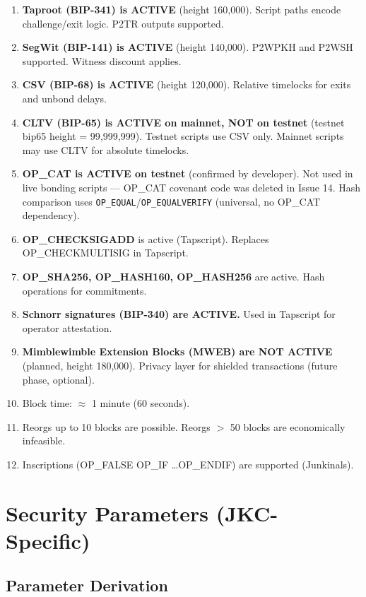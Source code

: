 \documentclass[a4paper,11pt]{article}
\begin{document}
\begin{enumerate}[nosep]
    \item \textbf{Taproot (BIP-341) is ACTIVE} (height 160{,}000). Script paths encode challenge/exit logic. P2TR outputs supported.
    \item \textbf{SegWit (BIP-141) is ACTIVE} (height 140{,}000). P2WPKH and P2WSH supported. Witness discount applies.
    \item \textbf{CSV (BIP-68) is ACTIVE} (height 120{,}000). Relative timelocks for exits and unbond delays.
    \item \textbf{CLTV (BIP-65) is ACTIVE on mainnet, NOT on testnet} (testnet bip65 height = 99{,}999{,}999). Testnet scripts use CSV only. Mainnet scripts may use CLTV for absolute timelocks.
    \item \textbf{OP\_CAT is ACTIVE on testnet} (confirmed by developer). Not used in live bonding scripts — OP\_CAT covenant code was deleted in Issue 14. Hash comparison uses \texttt{OP\_EQUAL}/\texttt{OP\_EQUALVERIFY} (universal, no OP\_CAT dependency).
    \item \textbf{OP\_CHECKSIGADD} is active (Tapscript). Replaces OP\_CHECKMULTISIG in Tapscript.
    \item \textbf{OP\_SHA256, OP\_HASH160, OP\_HASH256} are active. Hash operations for commitments.
    \item \textbf{Schnorr signatures (BIP-340) are ACTIVE.} Used in Tapscript for operator attestation.
    \item \textbf{Mimblewimble Extension Blocks (MWEB) are NOT ACTIVE} (planned, height 180{,}000). Privacy layer for shielded transactions (future phase, optional).
    \item Block time: $\approx$ 1 minute (60 seconds).
    \item Reorgs up to 10 blocks are possible. Reorgs $>$ 50 blocks are economically infeasible.
    \item Inscriptions (OP\_FALSE OP\_IF \ldots OP\_ENDIF) are supported (Junkinals).
\end{enumerate}

\section{Security Parameters (JKC-Specific)}

\subsection{Parameter Derivation}
\end{document}
